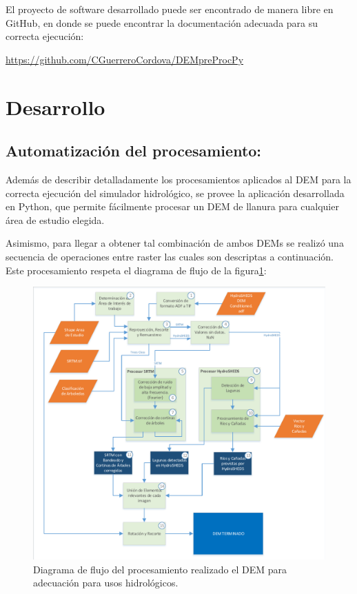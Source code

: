 \documentclass[10pt,a4paper, twoside]{report}
\begin{document}
El proyecto de software desarrollado puede ser encontrado de manera libre en GitHub, en donde se puede encontrar la documentación adecuada para su correcta ejecución: 

\hyperref[https://github.com/CGuerreroCordova/DEMpreProcPy]{https://github.com/CGuerreroCordova/DEMpreProcPy}

\section{Desarrollo}

\subsection{Automatización del procesamiento:} Además de describir detalladamente los procesamientos aplicados al DEM para la correcta ejecución del simulador hidrológico, se provee la aplicación desarrollada en Python, que permite fácilmente procesar un DEM de llanura para cualquier área de estudio elegida.

Asimismo, para llegar a obtener tal combinación de ambos DEMs se realizó una secuencia de operaciones entre raster las cuales son descriptas a continuación. Este procesamiento respeta el diagrama de flujo de la figura\ref{FlowCompleto}:

\begin{figure}[!htb]
   \centering      
   \includegraphics[width=1.0\textwidth]{imagenes/FlowChartsCompleto.pdf}
 \caption{Diagrama de flujo del procesamiento realizado el DEM para adecuación para usos hidrológicos.}
 \label{FlowCompleto}
\end{figure}
\end{document}
